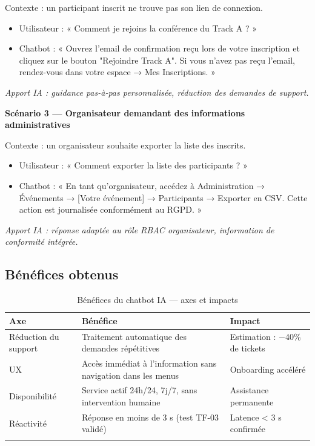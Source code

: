 Contexte : un participant inscrit ne trouve pas son lien de connexion.
\begin{itemize}
    \item Utilisateur : « Comment je rejoins la conférence du Track A ? »
    \item Chatbot : « Ouvrez l'email de confirmation reçu lors de votre inscription et cliquez sur le bouton "Rejoindre Track A". Si vous n'avez pas reçu l'email, rendez-vous dans votre espace → Mes Inscriptions. »
\end{itemize}
\textit{Apport IA : guidance pas-à-pas personnalisée, réduction des demandes de support.}

\textbf{Scénario 3 — Organisateur demandant des informations administratives}

Contexte : un organisateur souhaite exporter la liste des inscrits.
\begin{itemize}
    \item Utilisateur : « Comment exporter la liste des participants ? »
    \item Chatbot : « En tant qu'organisateur, accédez à Administration → Événements → [Votre événement] → Participants → Exporter en CSV. Cette action est journalisée conformément au RGPD. »
\end{itemize}
\textit{Apport IA : réponse adaptée au rôle RBAC organisateur, information de conformité intégrée.}

\subsection{Bénéfices obtenus}

\begin{longtable}{|m{3.5cm}|m{5.5cm}|m{4cm}|}
\hline
\textbf{Axe} & \textbf{Bénéfice} & \textbf{Impact} \\
\hline
\endhead
\endfoot
\endlastfoot
\hline
Réduction du support & Traitement automatique des demandes répétitives & Estimation : $-$40\% de tickets \\
\hline
UX & Accès immédiat à l'information sans navigation dans les menus & Onboarding accéléré \\
\hline
Disponibilité & Service actif 24h/24, 7j/7, sans intervention humaine & Assistance permanente \\
\hline
Réactivité & Réponse en moins de 3 s (test TF-03 validé) & Latence < 3 s confirmée \\
\hline
\captionsetup{justification=centering,margin=2cm}
\caption{Bénéfices du chatbot IA — axes et impacts}
\label{tab:chatbot_benefits}
\end{longtable}

